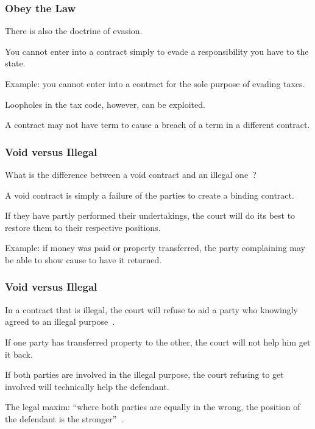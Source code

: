 \begin{frame}
\frametitle{Obey the Law}

There is also the \alert{doctrine of evasion}.

You cannot enter into a contract simply to evade a responsibility you have to the state.

Example: you cannot enter into a contract for the sole purpose of evading taxes.

Loopholes in the tax code, however, can be exploited.

A contract may not have term to cause a breach of a term in a different contract.

\end{frame}



\begin{frame}
\frametitle{Void versus Illegal}

What is the difference between a void contract and an illegal one~\cite{lba}?

A void contract is simply a failure of the parties to create a binding contract.

If they have partly performed their undertakings, the court will do its best to restore them to their respective positions.

Example: if money was paid or property transferred, the party complaining may be able to show cause to have it returned.

\end{frame}



\begin{frame}
\frametitle{Void versus Illegal}

In a contract that is illegal, the court will refuse to aid a party who knowingly agreed to an illegal purpose~\cite{lba}.

If one party has transferred property to the other, the court will not help him get it back. 

If both parties are involved in the illegal purpose, the court refusing to get involved will technically help the defendant. 

The legal maxim: ``where both parties are equally in the wrong, the position of the defendant is the stronger''~\cite{lba}.


\end{frame}






